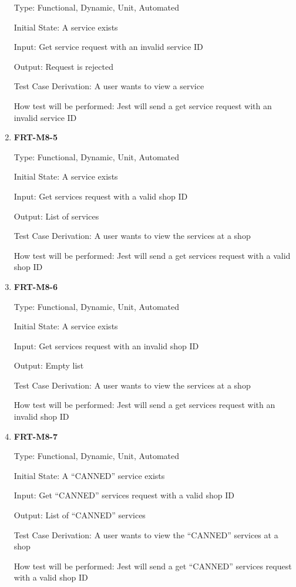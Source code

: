 \documentclass[12pt, titlepage]{article}
\begin{document}
\begin{enumerate}
	      Type: Functional, Dynamic, Unit, Automated

	      Initial State: A service exists

	      Input: Get service request with an invalid service ID

	      Output: Request is rejected

	      Test Case Derivation: A user wants to view a service

	      How test will be performed: Jest will send a get service request with an invalid service ID

	\item \textbf{FRT-M8-5}

	      Type: Functional, Dynamic, Unit, Automated

	      Initial State: A service exists

	      Input: Get services request with a valid shop ID

	      Output: List of services

	      Test Case Derivation: A user wants to view the services at a shop

	      How test will be performed: Jest will send a get services request with a valid shop ID

	\item \textbf{FRT-M8-6}

	      Type: Functional, Dynamic, Unit, Automated

	      Initial State: A service exists

	      Input: Get services request with an invalid shop ID

	      Output: Empty list

	      Test Case Derivation: A user wants to view the services at a shop

	      How test will be performed: Jest will send a get services request with an invalid shop ID

	\item \textbf{FRT-M8-7}

	      Type: Functional, Dynamic, Unit, Automated

	      Initial State: A ``CANNED'' service exists

	      Input: Get ``CANNED'' services request with a valid shop ID

	      Output: List of ``CANNED'' services

	      Test Case Derivation: A user wants to view the ``CANNED'' services at a shop

	      How test will be performed: Jest will send a get ``CANNED'' services request with a valid shop ID


\end{enumerate}
\end{document}
